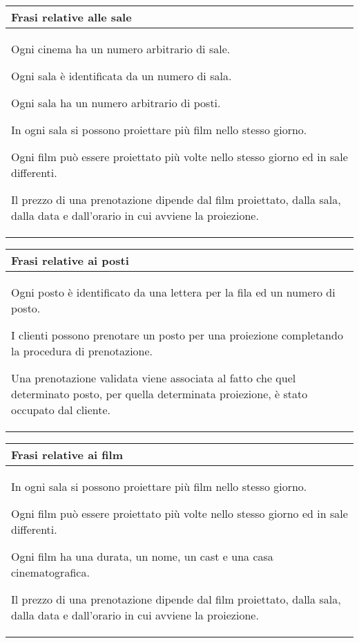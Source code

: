 \begin{tabularx}{\linewidth}{|X|}
      \hline
      \rowcolor{tblhdrcolor}
      \textbf{Frasi relative alle sale} \\\hline
      Ogni cinema ha un numero arbitrario di sale.

      Ogni sala è identificata da un numero di sala.

      Ogni sala ha un numero arbitrario di posti.

      In ogni sala si possono proiettare più film nello stesso giorno.

      Ogni film può essere proiettato più volte nello stesso giorno ed
      in sale differenti.

      Il prezzo di una prenotazione dipende dal film proiettato, dalla
      sala, dalla data e dall'orario in cui avviene la proiezione.
      \\ \hline
\end{tabularx}

\begin{tabularx}{\linewidth}{|X|}
      \hline
      \rowcolor{tblhdrcolor}
      \textbf{Frasi relative ai posti} \\\hline
      Ogni posto è identificato da una lettera per la fila ed un numero
      di posto.

      I clienti possono prenotare un posto per una proiezione completando la
      procedura di prenotazione.

      Una prenotazione validata viene associata al fatto che quel determinato
      posto, per quella determinata proiezione, è stato occupato dal cliente.
      \\ \hline
\end{tabularx}

\begin{tabularx}{\linewidth}{|X|}
      \hline
      \rowcolor{tblhdrcolor}
      \textbf{Frasi relative ai film} \\\hline
      In ogni sala si possono proiettare più film nello stesso giorno.

      Ogni film può essere proiettato più volte nello stesso giorno ed
      in sale differenti.

      Ogni film ha una durata, un nome, un cast e una
      casa cinematografica.

      Il prezzo di una prenotazione dipende dal film proiettato, dalla
      sala, dalla data e dall'orario in cui avviene la proiezione.
      \\ \hline
\end{tabularx}

